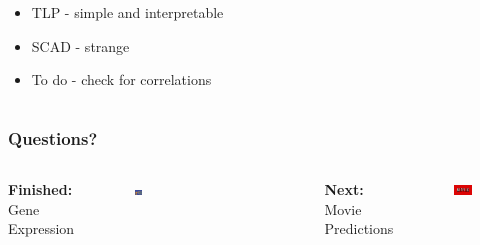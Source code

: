 \documentclass[table]{beamer}
\begin{document}
\begin{frame}
\begin{columns}[T]
\begin{column}{0.5\textwidth}
    \vspace*{0.3cm}
    \begin{itemize}
      \item TLP - simple and interpretable
      \item SCAD - strange
      \item To do - check for correlations
    \end{itemize}
    \end{column}
  \end{columns}
\end{frame}

\begin{frame}
  \frametitle{Questions?}
\begin{columns}[t] %

  \textbf{Finished:}\\
   Gene Expression
\begin{figure}
\includegraphics[width=0.8\linewidth]{DNA.jpg}
\end{figure}

  \textbf{}\\
\begin{figure}
\end{figure}

  \textbf{Next:}\\
  Movie Predictions
\begin{figure}
\includegraphics[width=0.8\linewidth]{netflix.png}
\end{figure}
\end{columns}
\end{frame}
\end{document}
